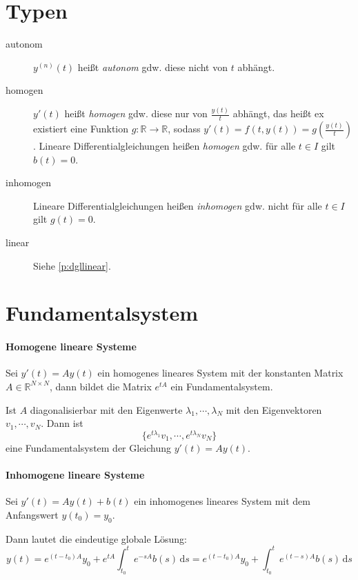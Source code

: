 \section{Typen}
	\begin{description}
		\item[autonom] $ y ^ {(n)} (t) $ heißt \textit{autonom} gdw. diese nicht von $ t $ abhängt.
		\item[homogen] $ y'(t) $ heißt \textit{homogen} gdw. diese nur von $ \frac{y(t)}{t} $ abhängt, das heißt ex existiert eine Funktion $ g : \mathbb{R} \rightarrow \mathbb{R} $, sodass $ y'(t) = f(t, y(t)) = g(\frac{y(t)}{t}) $. Lineare Differentialgleichungen heißen \textit{homogen} gdw. für alle $ t \in I $ gilt $ b(t) = 0 $.
		\item[inhomogen] Lineare Differentialgleichungen heißen \textit{inhomogen} gdw. nicht für alle $ t \in I $ gilt $ g(t) = 0 $.
		\item[linear] Siehe \ref{p:dgllinear}.
	\end{description}

\section{Fundamentalsystem}
	\paragraph{Homogene lineare Systeme}
		Sei $ y'(t) = Ay(t) $ ein homogenes lineares System mit der konstanten Matrix $ A \in \mathbb{R} ^ { N \times N } $, dann bildet die Matrix $ e ^ { tA } $ ein Fundamentalsystem.

		Ist $ A $ diagonalisierbar mit den Eigenwerte $ \lambda _ 1, \cdots, \lambda _ N $ mit den Eigenvektoren $ v _ 1, \cdots, v _ N $. Dann ist \[ \{ e ^ { t \lambda _ 1 } v _ 1, \cdots, e ^ { t \lambda _ N } v _ N \} \] eine Fundamentalsystem der Gleichung $ y'(t) = Ay(t) $.

	\paragraph{Inhomogene lineare Systeme}
		Sei $ y'(t) = Ay(t) + b(t) $ ein inhomogenes lineares System mit dem Anfangswert $ y(t _ 0) = y _ 0 $.

		Dann lautet die eindeutige globale Lösung:
		\begin{equation*}
			y(t) = e ^ { (t - t _ 0)A } y _ 0 + e ^ { tA } \int _ { t _ 0 } ^ t \! e ^ { -sA } b(s) \, \mathrm{d}s = e ^ { (t - t _ 0) A } y _ 0 + \int _ { t _ 0 } ^ t \! e ^ { (t - s) A } b(s) \, \mathrm{d}s
		\end{equation*}

